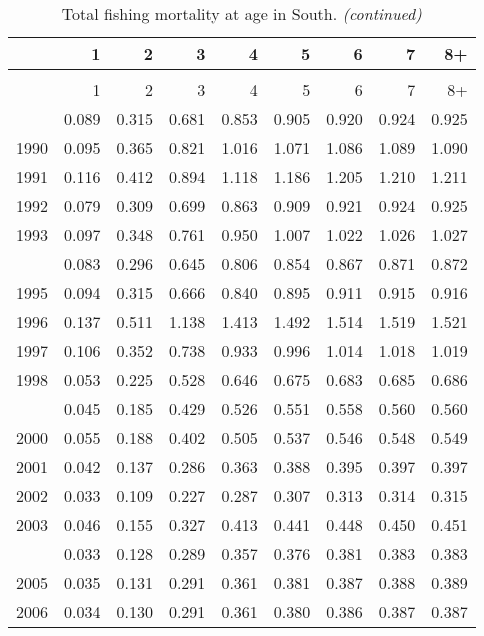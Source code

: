 \documentclass[
]{article}
\begin{document}
\begin{longtable}[t]{lrrrrrrrr}
\caption{\label{tab:South-region-FAA-table}Total fishing mortality at age in South.}\\
\toprule
  & 1 & 2 & 3 & 4 & 5 & 6 & 7 & 8+\\
\midrule
\endfirsthead
\caption[]{Total fishing mortality at age in South. \textit{(continued)}}\\
\toprule
  & 1 & 2 & 3 & 4 & 5 & 6 & 7 & 8+\\
\midrule
\endhead

\endfoot
\bottomrule
\endlastfoot
1989 & 0.089 & 0.315 & 0.681 & 0.853 & 0.905 & 0.920 & 0.924 & 0.925\\
1990 & 0.095 & 0.365 & 0.821 & 1.016 & 1.071 & 1.086 & 1.089 & 1.090\\
1991 & 0.116 & 0.412 & 0.894 & 1.118 & 1.186 & 1.205 & 1.210 & 1.211\\
1992 & 0.079 & 0.309 & 0.699 & 0.863 & 0.909 & 0.921 & 0.924 & 0.925\\
1993 & 0.097 & 0.348 & 0.761 & 0.950 & 1.007 & 1.022 & 1.026 & 1.027\\
\addlinespace
1994 & 0.083 & 0.296 & 0.645 & 0.806 & 0.854 & 0.867 & 0.871 & 0.872\\
1995 & 0.094 & 0.315 & 0.666 & 0.840 & 0.895 & 0.911 & 0.915 & 0.916\\
1996 & 0.137 & 0.511 & 1.138 & 1.413 & 1.492 & 1.514 & 1.519 & 1.521\\
1997 & 0.106 & 0.352 & 0.738 & 0.933 & 0.996 & 1.014 & 1.018 & 1.019\\
1998 & 0.053 & 0.225 & 0.528 & 0.646 & 0.675 & 0.683 & 0.685 & 0.686\\
\addlinespace
1999 & 0.045 & 0.185 & 0.429 & 0.526 & 0.551 & 0.558 & 0.560 & 0.560\\
2000 & 0.055 & 0.188 & 0.402 & 0.505 & 0.537 & 0.546 & 0.548 & 0.549\\
2001 & 0.042 & 0.137 & 0.286 & 0.363 & 0.388 & 0.395 & 0.397 & 0.397\\
2002 & 0.033 & 0.109 & 0.227 & 0.287 & 0.307 & 0.313 & 0.314 & 0.315\\
2003 & 0.046 & 0.155 & 0.327 & 0.413 & 0.441 & 0.448 & 0.450 & 0.451\\
\addlinespace
2004 & 0.033 & 0.128 & 0.289 & 0.357 & 0.376 & 0.381 & 0.383 & 0.383\\
2005 & 0.035 & 0.131 & 0.291 & 0.361 & 0.381 & 0.387 & 0.388 & 0.389\\
2006 & 0.034 & 0.130 & 0.291 & 0.361 & 0.380 & 0.386 & 0.387 & 0.387\\

\end{longtable}
\end{document}
